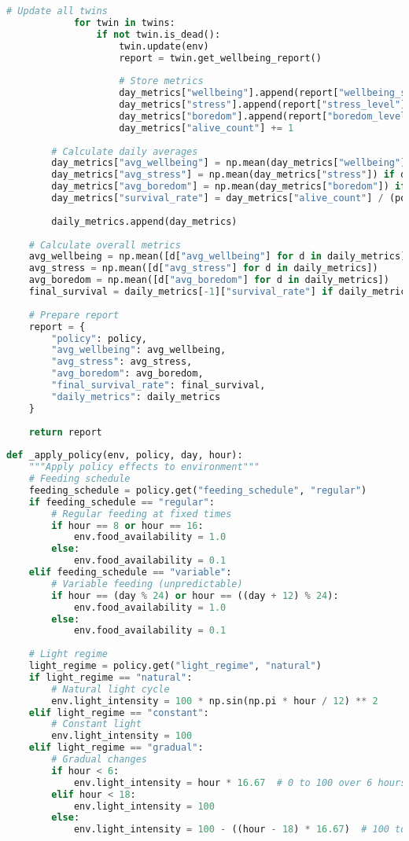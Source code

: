 \documentclass[11pt,a4paper]{article}
\begin{document}
\begin{lstlisting}[language=Python]
            # Update all twins
            for twin in twins:
                if not twin.is_dead():
                    twin.update(env)
                    report = twin.get_wellbeing_report()
                    
                    # Store metrics
                    day_metrics["wellbeing"].append(report["wellbeing_score"])
                    day_metrics["stress"].append(report["stress_level"])
                    day_metrics["boredom"].append(report["boredom_level"])
                    day_metrics["alive_count"] += 1
                    
        # Calculate daily averages
        day_metrics["avg_wellbeing"] = np.mean(day_metrics["wellbeing"]) if day_metrics["wellbeing"] else 0
        day_metrics["avg_stress"] = np.mean(day_metrics["stress"]) if day_metrics["stress"] else 0
        day_metrics["avg_boredom"] = np.mean(day_metrics["boredom"]) if day_metrics["boredom"] else 0
        day_metrics["survival_rate"] = day_metrics["alive_count"] / (population_size * steps_per_day)
        
        daily_metrics.append(day_metrics)
        
    # Calculate overall metrics
    avg_wellbeing = np.mean([d["avg_wellbeing"] for d in daily_metrics])
    avg_stress = np.mean([d["avg_stress"] for d in daily_metrics])
    avg_boredom = np.mean([d["avg_boredom"] for d in daily_metrics])
    final_survival = daily_metrics[-1]["survival_rate"] if daily_metrics else 0
    
    # Prepare report
    report = {
        "policy": policy,
        "avg_wellbeing": avg_wellbeing,
        "avg_stress": avg_stress,
        "avg_boredom": avg_boredom,
        "final_survival_rate": final_survival,
        "daily_metrics": daily_metrics
    }
    
    return report
    
def _apply_policy(env, policy, day, hour):
    """Apply policy effects to environment"""
    # Feeding schedule
    feeding_schedule = policy.get("feeding_schedule", "regular")
    if feeding_schedule == "regular":
        # Regular feeding at fixed times
        if hour == 8 or hour == 16:
            env.food_availability = 1.0
        else:
            env.food_availability = 0.1
    elif feeding_schedule == "variable":
        # Variable feeding (unpredictable)
        if hour == (day % 24) or hour == ((day + 12) % 24):
            env.food_availability = 1.0
        else:
            env.food_availability = 0.1
            
    # Light regime
    light_regime = policy.get("light_regime", "natural")
    if light_regime == "natural":
        # Natural light cycle
        env.light_intensity = 100 * np.sin(np.pi * hour / 12) ** 2
    elif light_regime == "constant":
        # Constant light
        env.light_intensity = 100
    elif light_regime == "gradual":
        # Gradual changes
        if hour < 6:
            env.light_intensity = hour * 16.67  # 0 to 100 over 6 hours
        elif hour < 18:
            env.light_intensity = 100
        else:
            env.light_intensity = 100 - ((hour - 18) * 16.67)  # 100 to 0 over 6 hours
\end{lstlisting}
\end{document}

